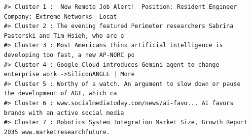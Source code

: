\documentclass[
  10pt,
]{article}
\newenvironment{Shaded}{\begin{snugshade}}{\end{snugshade}}
\newcommand{\AttributeTok}[1]{\textcolor[rgb]{0.13,0.29,0.53}{#1}}
\newcommand{\CommentTok}[1]{\textcolor[rgb]{0.56,0.35,0.01}{\textit{#1}}}
\newcommand{\ControlFlowTok}[1]{\textcolor[rgb]{0.13,0.29,0.53}{\textbf{#1}}}
\newcommand{\DecValTok}[1]{\textcolor[rgb]{0.00,0.00,0.81}{#1}}
\newcommand{\FunctionTok}[1]{\textcolor[rgb]{0.13,0.29,0.53}{\textbf{#1}}}
\newcommand{\NormalTok}[1]{#1}
\newcommand{\OtherTok}[1]{\textcolor[rgb]{0.56,0.35,0.01}{#1}}
\newcommand{\SpecialCharTok}[1]{\textcolor[rgb]{0.81,0.36,0.00}{\textbf{#1}}}
\newcommand{\StringTok}[1]{\textcolor[rgb]{0.31,0.60,0.02}{#1}}
\begin{document}
\begin{Shaded}
\end{Shaded}

\begin{verbatim}
#> Cluster 1 :  New Remote Job Alert!  Position: Resident Engineer  Company: Extreme Networks  Locat 
#> Cluster 2 : The evening featured Perimeter researchers Sabrina Pasterski and Tim Hsieh, who are e 
#> Cluster 3 : Most Americans think artificial intelligence is developing too fast, a new AP-NORC po 
#> Cluster 4 : Google Cloud introduces Gemini agent to change enterprise work ->SiliconANGLE | More  
#> Cluster 5 : Worthy of a watch. An argument to slow down or pause the development of AGI, which ca 
#> Cluster 6 : www.socialmediatoday.com/news/ai-favo... AI favors brands with an active social media 
#> Cluster 7 : Robotics System Integration Market Size, Growth Report 2035 www.marketresearchfuture.
\end{verbatim}
\end{document}
